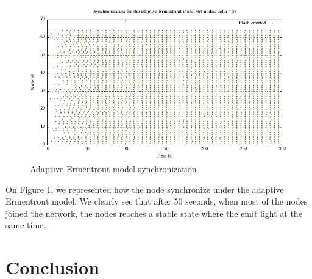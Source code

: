 \documentclass[a4paper, 11pt]{article}
\theoremstyle{plain}
\theoremstyle{definition}
\begin{document}
     \begin{figure}[h]
       \centering
       \includegraphics[scale=0.8]{../Plots/Firefly-er-64nodes-d5-2.pdf}
       \caption{Adaptive Ermentrout model synchronization}
       \label{fig:er-sync}
     \end{figure}


     On Figure \ref{fig:er-sync}, we represented how the node synchronize under the adaptive Ermentrout
     model. We clearly see that after 50 seconds, when most of the nodes joined the network, the nodes reaches
     a stable state where the emit light at the same time.

     

     



\section{Conclusion}
\label{sec:conclusion}

  



    
    
    












	
\end{document}
